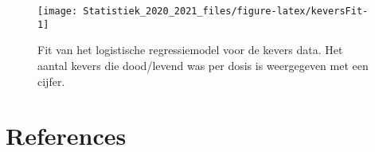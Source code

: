 \documentclass[
  12pt,dutch,coursenotes]{book}
\theoremstyle{definition}
\theoremstyle{definition}
\theoremstyle{definition}
\theoremstyle{remark}
\begin{document}
\begin{figure}

{\centering \texttt{[image: Statistiek\_2020\_2021\_files/figure-latex/keversFit-1]} 

}

\caption{Fit van het logistische regressiemodel voor de kevers data. Het aantal kevers die dood/levend was per dosis is weergegeven met een cijfer.}\label{fig:keversFit}
\end{figure}

\hypertarget{references}{%
\chapter{References}\label{references}}

  
\end{document}

